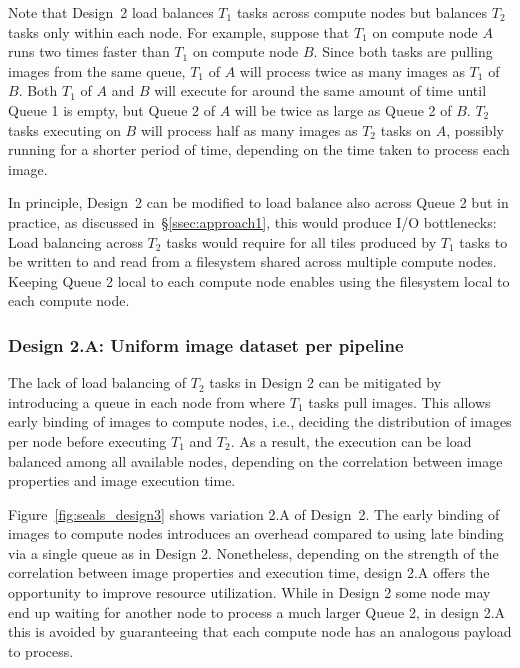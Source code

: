 Note that Design~2 load balances $T_{1}$ tasks across compute nodes but  balances $T_{2}$ tasks only within each node.
For example, suppose that $T_{1}$ on compute node $A$ runs two times faster than $T_{1}$ on compute node $B$.
Since both tasks are pulling images from the same queue, $T_{1}$ of $A$ will process twice as many images as $T_{1}$ of $B$.
Both $T_{1}$ of $A$ and $B$ will execute for around the same amount of time until Queue 1 is empty, but Queue 2 of $A$ will be twice as large as Queue 2 of $B$.
$T_{2}$ tasks executing on $B$ will process half as many images as $T_{2}$ tasks on $A$, possibly running for a shorter period of time, depending on the time taken to process each image.

In principle, Design~2 can be modified to load balance also across Queue 2 but in practice, as discussed in~\S\ref{ssec:approach1}, this would produce I/O bottlenecks:
Load balancing across $T_{2}$ tasks would require for all tiles produced by $T_{1}$ tasks to be written to and read  from a filesystem shared across multiple compute nodes.
Keeping Queue 2 local to each compute node enables using the filesystem local to each compute node.

\subsubsection{Design 2.A: Uniform image dataset per pipeline}
\label{sssec:approach2a}

The lack of load balancing of $T_{2}$ tasks in Design 2 can be mitigated by introducing a queue in each node from where $T_{1}$ tasks pull images.
This allows early binding of images to compute nodes, i.e., deciding the distribution of images per node before executing $T_{1}$ and $T_{2}$.
As a result, the execution can be load balanced among all available nodes, depending on the correlation between image properties and image execution time.

Figure~\ref{fig:seals_design3} shows variation 2.A of Design~2.
The early binding of images to compute nodes introduces an overhead compared to using late binding via a single queue as in Design 2.
Nonetheless, depending on the strength of the correlation between image properties and execution time, design 2.A offers the opportunity to improve resource utilization.
While in Design 2 some node may end up waiting for another node to process a much larger Queue 2, in design 2.A this is avoided by guaranteeing that each compute node has an analogous payload to process.


